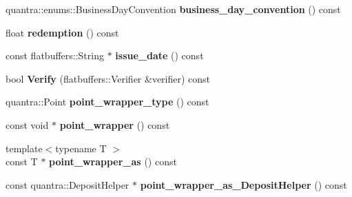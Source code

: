 \begin{DoxyCompactItemize}
\item 
\mbox{\label{structquantra_1_1FLATBUFFERS__FINAL__CLASS_acc1afb278b3cf7c9923940b4704456f9}} 
quantra\+::enums\+::\+Business\+Day\+Convention {\bfseries business\+\_\+day\+\_\+convention} () const
\item 
\mbox{\label{structquantra_1_1FLATBUFFERS__FINAL__CLASS_a5d41c47e7e4513418d304c46ff663eb9}} 
float {\bfseries redemption} () const
\item 
\mbox{\label{structquantra_1_1FLATBUFFERS__FINAL__CLASS_adf3517b162e1be9f52e6c0de30b15ab4}} 
const flatbuffers\+::\+String $\ast$ {\bfseries issue\+\_\+date} () const
\item 
\mbox{\label{structquantra_1_1FLATBUFFERS__FINAL__CLASS_aed693ee5a45b5f53af7411f9cab6793a}} 
bool {\bfseries Verify} (flatbuffers\+::\+Verifier \&verifier) const
\item 
\mbox{\label{structquantra_1_1FLATBUFFERS__FINAL__CLASS_adcbe84e9f247a884dd9d5f7c1c8eab0d}} 
quantra\+::\+Point {\bfseries point\+\_\+wrapper\+\_\+type} () const
\item 
\mbox{\label{structquantra_1_1FLATBUFFERS__FINAL__CLASS_a68a93717cad0ef23bea14144b5157eeb}} 
const void $\ast$ {\bfseries point\+\_\+wrapper} () const
\item 
\mbox{\label{structquantra_1_1FLATBUFFERS__FINAL__CLASS_a1f13a377e4fb1f0382a3f39a7a9fd560}} 
{\footnotesize template$<$typename T $>$ }\\const T $\ast$ {\bfseries point\+\_\+wrapper\+\_\+as} () const
\item 
\mbox{\label{structquantra_1_1FLATBUFFERS__FINAL__CLASS_af4a7ff31dcb20df1567267364d40b888}} 
const quantra\+::\+Deposit\+Helper $\ast$ {\bfseries point\+\_\+wrapper\+\_\+as\+\_\+\+Deposit\+Helper} () const
\item 
\mbox{\label{structquantra_1_1FLATBUFFERS__FINAL__CLASS_a0ffb255a2ab81a871d9003e8e1619221}} 

\end{DoxyCompactItemize}
